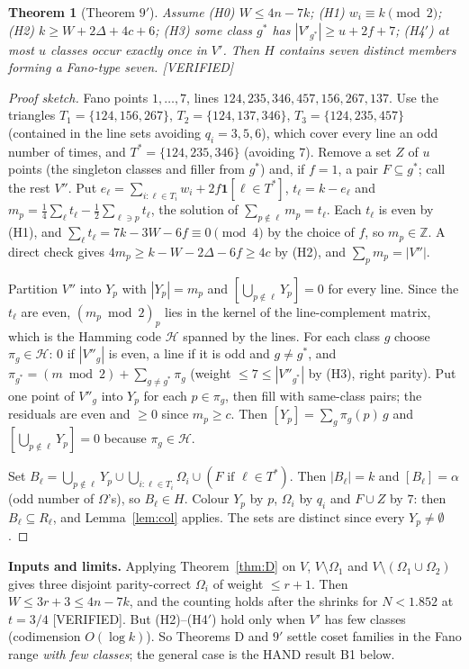 \documentclass[11pt]{article}
\newtheorem{theorem}{Theorem}[section]
\theoremstyle{definition}
\newcommand{\st}[1]{\textsf{\small[#1]}}
\begin{document}
\begin{theorem}[Theorem $9'$]\label{thm:9}
Assume (H0) $W\le4n-7k$; (H1) $w_i\equiv k\pmod2$; (H2) $k\ge W+2\Delta+4c+6$; (H3) some class $g^*$ has
$|V'_{g^*}|\ge u+2f+7$; (H4$'$) at most $u$ classes occur exactly once in $V'$. Then $H$ contains seven distinct
members forming a Fano-type seven. \st{VERIFIED}
\end{theorem}
\begin{proof}[Proof sketch]
Fano points $1,\dots,7$, lines $124,235,346,457,156,267,137$. Use the triangles $T_1=\{124,156,267\}$,
$T_2=\{124,137,346\}$, $T_3=\{124,235,457\}$ (contained in the line sets avoiding $q_i=3,5,6$), which cover every line
an odd number of times, and $T^*=\{124,235,346\}$ (avoiding $7$). Remove a set $Z$ of $u$ points (the singleton
classes and filler from $g^*$) and, if $f=1$, a pair $F\subseteq g^*$; call the rest $V''$. Put
$e_\ell=\sum_{i:\ell\in T_i}w_i+2f\mathbf 1[\ell\in T^*]$, $t_\ell=k-e_\ell$ and
$m_p=\tfrac14\sum_\ell t_\ell-\tfrac12\sum_{\ell\ni p}t_\ell$, the solution of $\sum_{p\notin\ell}m_p=t_\ell$. Each
$t_\ell$ is even by (H1), and $\sum_\ell t_\ell=7k-3W-6f\equiv0\pmod4$ by the choice of $f$, so $m_p\in\mathbb Z$. A
direct check gives $4m_p\ge k-W-2\Delta-6f\ge4c$ by (H2), and $\sum_pm_p=|V''|$.

Partition $V''$ into $Y_p$ with $|Y_p|=m_p$ and $[\bigcup_{p\notin\ell}Y_p]=0$ for every line. Since the $t_\ell$ are
even, $(m_p\bmod2)_p$ lies in the kernel of the line-complement matrix, which is the Hamming code $\mathcal H$ spanned
by the lines. For each class $g$ choose $\pi_g\in\mathcal H$: $0$ if $|V''_g|$ is even, a line if it is odd and $g\ne
g^*$, and $\pi_{g^*}=(m\bmod2)+\sum_{g\ne g^*}\pi_g$ (weight $\le7\le|V''_{g^*}|$ by (H3), right parity). Put one
point of $V''_g$ into $Y_p$ for each $p\in\pi_g$, then fill with same-class pairs; the residuals are even and $\ge0$
since $m_p\ge c$. Then $[Y_p]=\sum_g\pi_g(p)\,g$ and $[\bigcup_{p\notin\ell}Y_p]=0$ because $\pi_g\in\mathcal H$.

Set $B_\ell=\bigcup_{p\notin\ell}Y_p\cup\bigcup_{i:\ell\in T_i}\Omega_i\cup(F\text{ if }\ell\in T^*)$. Then
$|B_\ell|=k$ and $[B_\ell]=\alpha$ (odd number of $\Omega$'s), so $B_\ell\in H$. Colour $Y_p$ by $p$, $\Omega_i$ by
$q_i$ and $F\cup Z$ by $7$: then $B_\ell\subseteq R_\ell$, and Lemma~\ref{lem:col} applies. The sets are distinct since
every $Y_p\ne\emptyset$.
\end{proof}

\noindent\textbf{Inputs and limits.} Applying Theorem~\ref{thm:D} on $V$, $V\setminus\Omega_1$ and
$V\setminus(\Omega_1\cup\Omega_2)$ gives three disjoint parity-correct $\Omega_i$ of weight $\le r+1$. Then
$W\le3r+3\le4n-7k$, and the counting holds after the shrinks for $N<1.852$ at $t=3/4$ \st{VERIFIED}. But (H2)--(H4$'$)
hold only when $V'$ has few classes (codimension $O(\log k)$). So Theorems D and $9'$ settle coset families in the Fano
range \emph{with few classes}; the general case is the HAND result B1 below.
\end{document}
